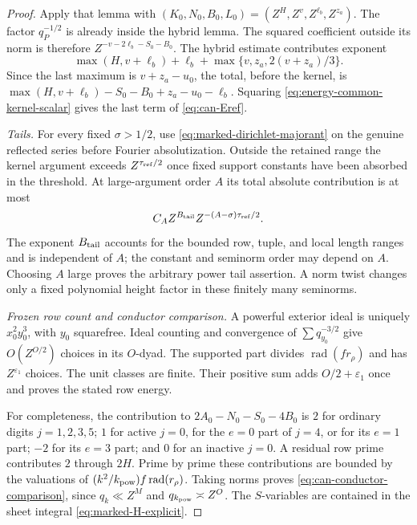 \documentclass[11pt,a4paper]{article}
\numberwithin{equation}{section}
\theoremstyle{definition}
\theoremstyle{remark}
\newcommand{\eps}{\varepsilon}
\newcommand{\rad}{\operatorname{rad}}
\begin{document}
\begin{proof}
Apply that lemma with $(K_0,N_0,B_0,L_0)=(Z^H,Z^v,Z^{\ell_b},Z^{z_a})$.
The factor $q_P^{-1/2}$ is already inside the hybrid lemma.
The squared coefficient outside its norm is therefore
$Z^{-v-2\ell_b-S_0-B_0}$.  The hybrid estimate contributes exponent
\[
 \max(H,v+\ell_b)+\ell_b+
              \max\{v,z_a,2(v+z_a)/3\}.
\]
Since the last maximum is $v+z_a-u_0$, the total, before the
kernel, is
$\max(H,v+\ell_b)-S_0-B_0+z_a-u_0-\ell_b$.
Squaring \eqref{eq:energy-common-kernel-scalar} gives the last term
of \eqref{eq:can-Eref}.

\emph{Tails.}
For every fixed $\sigma>1/2$, use
\eqref{eq:marked-dirichlet-majorant} on the genuine reflected series
before Fourier absolutization.  Outside the retained range the
kernel argument exceeds $Z^{\tau_{\rm ref}/2}$ once fixed support
constants have been absorbed in the threshold.  At large-argument
order $A$ its total absolute contribution is at most
\[
 C_A Z^{B_{\rm tail}} Z^{-(A-\sigma)\tau_{\rm ref}/2}.
\]
The exponent $B_{\rm tail}$ accounts for the bounded row, tuple,
and local length ranges and is independent of $A$; the constant and
seminorm order may depend on $A$.  Choosing $A$ large proves the
arbitrary power tail assertion.  A norm twist changes only a fixed
polynomial height factor in these finitely many seminorms.

\emph{Frozen row count and conductor comparison.}
A powerful exterior ideal is uniquely $x_0^2y_0^3$, with $y_0$
squarefree.  Ideal counting and convergence of
$\sum q_{y_0}^{-3/2}$ give $O(Z^{O/2})$ choices in its $O$-dyad.
The supported part divides $\rad(f r_\rho)$ and has $Z^{\eps_1}$
choices.  The unit classes are finite.  Their positive sum adds
$O/2+\eps_1$ once and proves the stated row energy.

For completeness, the contribution to
$2A_0-N_0-S_0-4B_0$ is $2$ for ordinary digits $j=1,2,3,5$;
$1$ for active $j=0$, for the $e=0$ part of $j=4$, or for its
$e=1$ part; $-2$ for its $e=3$ part; and $0$ for an inactive $j=0$.
A residual row prime contributes $2$ through $2H$.
Prime by prime these contributions are bounded by the valuations of
$(k^2/k_{\rm pow})f\rad(r_\rho)$.
Taking norms proves \eqref{eq:can-conductor-comparison}, since
$q_k\ll Z^M$ and $q_{k_{\rm pow}}\asymp Z^O$.
The $S$-variables are contained in the sheet integral
\eqref{eq:marked-H-explicit}.
\end{proof}
\end{document}
